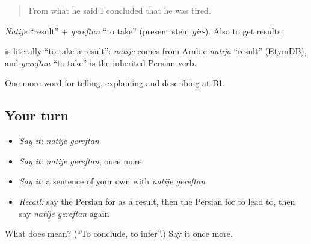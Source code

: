 \begin{quote}
From what he said I concluded that he was tired.
\end{quote}

\emph{Natije} \textquotedblleft{}result\textquotedblright{} + \emph{gereftan} \textquotedblleft{}to take\textquotedblright{} (present stem \emph{gir-}). Also to get results.

\begin{cousinweb}
\textbf{ } is literally \textquotedblleft{}to take a result\textquotedblright{}: \emph{natije} comes from Arabic \emph{natīja} \textquotedblleft{}result\textquotedblright{} (EtymDB), and \emph{gereftan} \textquotedblleft{}to take\textquotedblright{} is the inherited Persian verb.
\end{cousinweb}

\begin{grammarlens}[title={What you've built}]
One more word for telling, explaining and describing at B1.
\end{grammarlens}

\subsection*{Your turn}
\begin{itemize}
\raggedright
  \item \emph{Say it:} \emph{natije gereftan}
  \item \emph{Say it:} \emph{natije gereftan}, once more
  \item \emph{Say it:} a sentence of your own with \emph{natije gereftan}
  \item \emph{Recall:} say the Persian for as a result, then the Persian for to lead to, then say \emph{natije gereftan} again
\end{itemize}

\begin{tcolorbox}[breakable,colback=teal!4,colframe=teal!35!black,title={Before you move on}]
What does   mean? (\textquotedblleft{}To conclude, to infer\textquotedblright{}.) Say it once more.
\end{tcolorbox}
